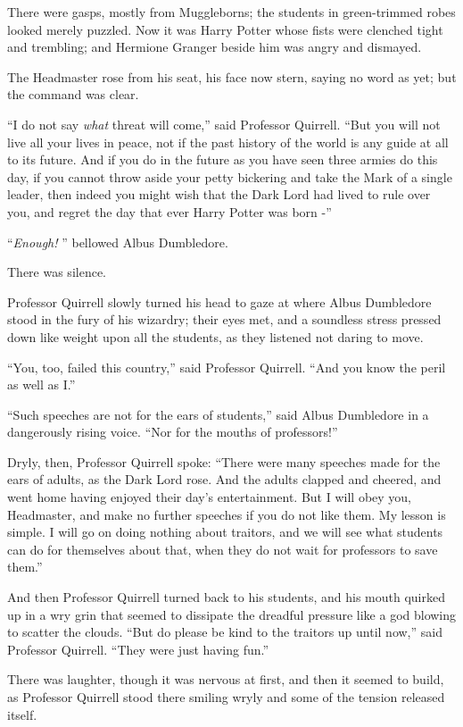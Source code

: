 There were gasps, mostly from Muggleborns; the students in green-trimmed
robes looked merely puzzled. Now it was Harry Potter whose fists were
clenched tight and trembling; and Hermione Granger beside him was angry
and dismayed.

The Headmaster rose from his seat, his face now stern, saying no word as
yet; but the command was clear.

``I do not say \emph{what} threat will come,'' said Professor Quirrell.
``But you will not live all your lives in peace, not if the past history
of the world is any guide at all to its future. And if you do in the
future as you have seen three armies do this day, if you cannot throw
aside your petty bickering and take the Mark of a single leader, then
indeed you might wish that the Dark Lord had lived to rule over you, and
regret the day that ever Harry Potter was born -''

``\emph{Enough!} '' bellowed Albus Dumbledore.

There was silence.

Professor Quirrell slowly turned his head to gaze at where Albus
Dumbledore stood in the fury of his wizardry; their eyes met, and a
soundless stress pressed down like weight upon all the students, as they
listened not daring to move.

``You, too, failed this country,'' said Professor Quirrell. ``And you
know the peril as well as I.''

``Such speeches are not for the ears of students,'' said Albus
Dumbledore in a dangerously rising voice. ``Nor for the mouths of
professors!''

Dryly, then, Professor Quirrell spoke: ``There were many speeches made
for the ears of adults, as the Dark Lord rose. And the adults clapped
and cheered, and went home having enjoyed their day's entertainment. But
I will obey you, Headmaster, and make no further speeches if you do not
like them. My lesson is simple. I will go on doing nothing about
traitors, and we will see what students can do for themselves about
that, when they do not wait for professors to save them.''

And then Professor Quirrell turned back to his students, and his mouth
quirked up in a wry grin that seemed to dissipate the dreadful pressure
like a god blowing to scatter the clouds. ``But do please be kind to the
traitors up until now,'' said Professor Quirrell. ``They were just
having fun.''

There was laughter, though it was nervous at first, and then it seemed
to build, as Professor Quirrell stood there smiling wryly and some of
the tension released itself.

